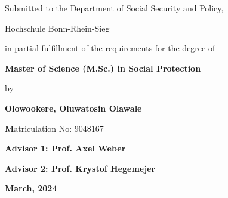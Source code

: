 \begin{titlepage}
\vspace{1cm}
{\large Submitted to the Department of Social Security and Policy,}\par
\vspace{0.1cm}
{\large Hochschule Bonn-Rhein-Sieg}\par
\vspace{0.2cm}
{\large in partial fulfillment of the requirements for the degree of}\par
\vspace{0.1cm}
{\large \textbf{Master of Science (M.Sc.) in Social Protection}}\par
\vspace{1.5cm}
{\large by}\par
\vspace{0.25cm}
{\large \textbf{Olowookere, Oluwatosin Olawale}}\par
\vspace{0.3cm}
{\large \textbf Matriculation No: 9048167}\par
\vspace{1.7cm}
{\large \textbf{Advisor 1: Prof. Axel Weber}}\par
\vspace{0.3cm}
{\large \textbf{Advisor 2: Prof. Krystof Hegemejer}}\par
\vspace{1.5cm}
{\large \textbf{\hfill \hfill \hfill March, 2024}}\par
\end{titlepage}
